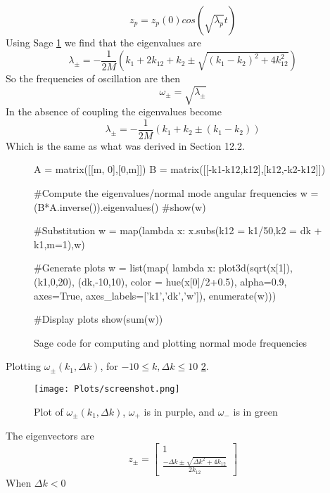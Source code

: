 \begin{equation}
    z_p = z_p(0)cos(\sqrt{\lambda_p}t)
\end{equation}
Using Sage \ref{fig:normalmode-freq} we find that the eigenvalues are
\begin{equation}
    \lambda_\pm = -\frac{1}{2M}\left ( k_1 + 2k_{12} + k_2 \pm \sqrt{(k_1-k_2)^2+4k_{12}^2} \right )
\end{equation}
So the frequencies of oscillation are then
\begin{equation}
    \omega_\pm = \sqrt{\lambda_\pm}
\end{equation}
In the absence of coupling the eigenvalues become
\begin{equation}
    \lambda_\pm = -\frac{1}{2M}\left ( k_1 + k_2 \pm (k_1 - k_2) \right )
\end{equation}
Which is the same as what was derived in Section 12.2.
\begin{figure}
    \begin{python}
    A = matrix([[m, 0],[0,m]])
    B = matrix([[-k1-k12,k12],[k12,-k2-k12]])
    
    #Compute the eigenvalues/normal mode angular frequencies
    w = (B*A.inverse()).eigenvalues()
    #show(w)
    
    #Substitution
    w = map(lambda x: x.subs(k12 = k1/50,k2 = dk + k1,m=1),w)
    
    #Generate plots
    w = list(map(
        lambda x: plot3d(sqrt(x[1]),
                         (k1,0,20),
                         (dk,-10,10),
                         color = hue(x[0]/2+0.5),
                         alpha=0.9,
                         axes=True,
                         axes_labels=['k1','dk','w']),
        enumerate(w)))
    
    #Display plots
    show(sum(w))
    \end{python}
    \caption{Sage code for computing and plotting normal mode frequencies}
    \label{fig:normalmode-freq}
\end{figure}
Plotting $\omega_\pm(k_1,\Delta k)$, for $-10 \leq k, \Delta k \leq 10$ \ref{fig:eigenvals}.
\begin{figure}[h]
    \centering
    \texttt{[image: Plots/screenshot.png]}
    \caption{Plot of $\omega_\pm(k_1,\Delta k)$, $\omega_+$ is in purple, and $\omega_-$ is in green}
    \label{fig:eigenvals}
\end{figure}
The eigenvectors are
\begin{equation}
    z_\pm = \begin{bmatrix}
        1\\
        \frac{-\Delta k\pm \sqrt{\Delta k^2+4k_{12}}}{2k_{12}}
    \end{bmatrix}
\end{equation}
When $\Delta k < 0$

